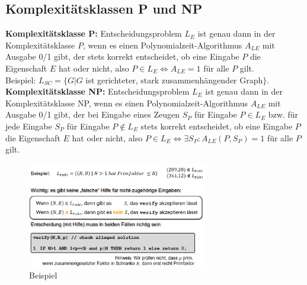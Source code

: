 \documentclass{article}
\begin{document}
        \subsection{Komplexitätsklassen P und NP}
            \textbf{Komplexitätsklasse P:} Entscheidungsproblem $L_E$ ist genau dann in der Komplexitätsklasse $P$, wenn es einen Polynomialzeit-Algorithmus $A_{LE}$ mit Ausgabe 0/1 gibt, der stets korrekt entscheidet, ob eine Eingabe $P$ die Eigenschaft $E$ hat oder nicht, also $P\in L_E \Leftrightarrow A_{LE} = 1$ für alle $P$ gilt.\\
            Beispiel: $L_{SC}=\{G|G$ ist gerichteter, stark zusammenhängender Graph$\}$.\\
            \textbf{Komplexitätsklasse NP:} Entscheidungsproblem $L_E$ ist genau dann in der Komplexitätsklasse NP, wenn es einen Polynomialzeit-Algorithmus $A_{LE}$ mit Ausgabe 0/1 gibt, der bei Eingabe eines Zeugen $S_P$ für Eingabe $P\in L_E$ bzw. für jede Eingabe $S_P$ für Eingabe $P\notin L_E$ stets korrekt entscheidet, ob eine Eingabe $P$ die Eigenschaft $E$ hat oder nicht, also $P\in L_E \Leftrightarrow \exists S_P: A_{LE}(P,S_P) = 1$ für alle $P$ gilt.\\
            \begin{figure}[ht]
                \centering
                \includegraphics[width=0.7\textwidth]{Bilder/NPBsp.png}
                \caption{Beispiel}
                \label{fig:NPBsp}
            \end{figure}
\end{document}
